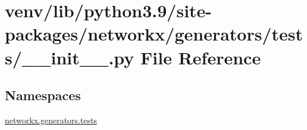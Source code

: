 \hypertarget{venv_2lib_2python3_89_2site-packages_2networkx_2generators_2tests_2____init_____8py}{}\section{venv/lib/python3.9/site-\/packages/networkx/generators/tests/\+\_\+\+\_\+init\+\_\+\+\_\+.py File Reference}
\label{venv_2lib_2python3_89_2site-packages_2networkx_2generators_2tests_2____init_____8py}
\subsection*{Namespaces}
\begin{DoxyCompactItemize}
\item 
 \hyperlink{namespacenetworkx_1_1generators_1_1tests}{networkx.\+generators.\+tests}
\end{DoxyCompactItemize}

